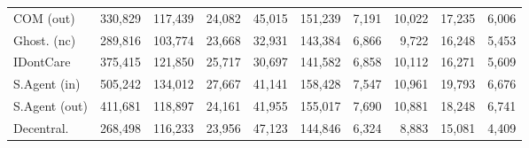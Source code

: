 \begin{table}[t]
\begin{tabular}{lrrrrrrrrr}
COM (out) & 330,829 & 117,439 & 24,082 & 45,015 & 151,239 & 7,191 & 10,022 & 17,235 & 6,006 \\
Ghost. (nc) & 289,816 & 103,774 & 23,668 & 32,931 & 143,384 & 6,866 & 9,722 & 16,248 & 5,453 \\
IDontCare & 375,415 & 121,850 & 25,717 & 30,697 & 141,582 & 6,858 & 10,112 & 16,271 & 5,609 \\
S.Agent (in) & 505,242 & 134,012 & 27,667 & 41,141 & 158,428 & 7,547 & 10,961 & 19,793 & 6,676 \\
S.Agent (out) & 411,681 & 118,897 & 24,161 & 41,955 & 155,017 & 7,690 & 10,881 & 18,248 & 6,741 \\
Decentral. & 268,498 & 116,233 & 23,956 & 47,123 & 144,846 & 6,324 & 8,883 & 15,081 & 4,409 \\
\bottomrule
\end{tabular}
\end{table}